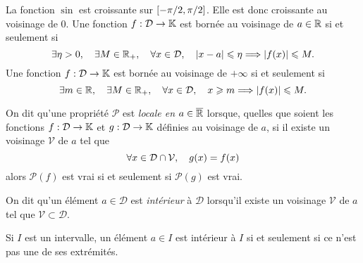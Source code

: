 \documentclass{magnolia}
\begin{document}


\begin{remarques}
\remarque La fonction $\sin$ est croissante sur $\left[-\pi/2,\pi/2\right]$. Elle
  est donc croissante au voisinage de 0.
\remarque Une fonction $f:\mathcal{D}\to\mathbb{K}$ est bornée au voisinage de $a\in\mathbb{R}$ si et seulement si
   \[\exists \eta>0 ,\quad \exists M\in\mathbb{R}_+ ,\quad \forall x\in\mathcal{D}
     ,\quad \left|x-a\right|\leqslant\eta \Longrightarrow \left|f(x)\right|\leqslant M.\]
  Une fonction $f:\mathcal{D}\to\mathbb{K}$ est bornée au voisinage de $+\infty$ si et seulement si
   \[\exists m\in\mathbb{R} ,\quad \exists M\in\mathbb{R}_+ ,\quad \forall x\in\mathcal{D}
     ,\quad x\geqslant m \Longrightarrow \left|f(x)\right|\leqslant M.\]
\end{remarques}


\begin{definition}[utile=-3]
On dit qu'une propriété $\mathcal{P}$ est \emph{locale en $a\in\overline{\mathbb{R}}$} lorsque, quelles que
soient les fonctions $f:\mathcal{D}\to\mathbb{K}$ et $g:\mathcal{D}\to\mathbb{K}$ définies au voisinage de $a$, si il
existe un voisinage $\mathcal{V}$ de $a$ tel que
\[\forall x\in\mathcal{D}\cap\mathcal{V} ,\quad g(x)=f(x)\]
alors $\mathcal{P}(f)$ est vrai si et seulement si $\mathcal{P}(g)$ est vrai.
\end{definition}


\begin{definition}
On dit qu'un élément $a\in \mathcal{D}$ est \emph{intérieur} à $\mathcal{D}$ lorsqu'il existe un voisinage
$\mathcal{V}$ de $a$ tel que $\mathcal{V}\subset\mathcal{D}$. 
\end{definition}

\begin{remarqueUnique}
\remarque Si $I$ est un intervalle, un élément $a\in I$ est intérieur à $I$ si et seulement si ce n'est pas
  une de ses extrémités.
\end{remarqueUnique}
\end{document}
